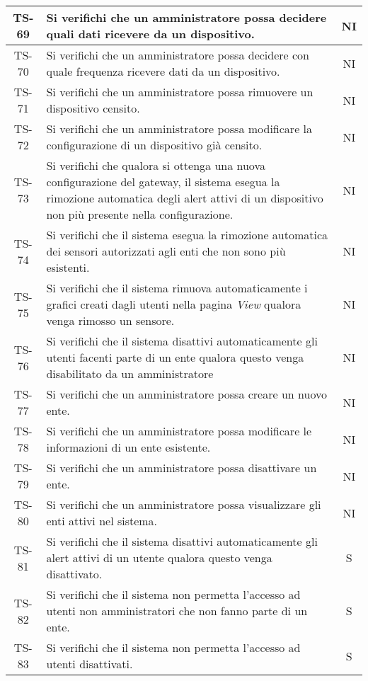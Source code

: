 \begin{center}
\begin{longtable}{|c|p{10cm}|c|}
			 \hline
			 TS-69 & Si verifichi che un amministratore possa decidere quali dati ricevere da un dispositivo. & NI \\
			 \hline
			 TS-70 & Si verifichi che un amministratore possa decidere con quale frequenza ricevere dati da un dispositivo. & NI \\
			 \hline
			 TS-71 & Si verifichi che un amministratore possa rimuovere un dispositivo censito. & NI \\
			 \hline
			 TS-72 & Si verifichi che un amministratore possa modificare la configurazione di un dispositivo già censito. & NI \\
			 \hline
			 TS-73 & Si verifichi che qualora si ottenga una nuova configurazione del gateway, il sistema esegua la rimozione automatica degli alert attivi di un dispositivo non più presente nella configurazione. & NI \\
			 \hline
			 TS-74 & Si verifichi che il sistema esegua la rimozione automatica dei sensori autorizzati agli enti che non sono più esistenti. & NI \\
			 \hline
			 TS-75 & Si verifichi che il sistema rimuova automaticamente i grafici creati dagli utenti nella pagina \textit{View} qualora venga rimosso un sensore. & NI \\
			 \hline
			 TS-76 & Si verifichi che il sistema disattivi automaticamente gli utenti facenti parte di un ente qualora questo venga disabilitato da un amministratore & NI \\
			 \hline
			 TS-77 & Si verifichi che un amministratore possa creare un nuovo ente. & NI \\
			 \hline
			 TS-78 & Si verifichi che un amministratore possa modificare le informazioni di un ente esistente. & NI \\
			 \hline
			 TS-79 & Si verifichi che un amministratore possa disattivare un ente. & NI \\
			 \hline
			 TS-80 & Si verifichi che un amministratore possa visualizzare gli enti attivi nel sistema. & NI \\
			 \hline
			 TS-81 & Si verifichi che il sistema disattivi automaticamente gli alert attivi di un utente qualora questo venga disattivato. & S \\
			 \hline
			 TS-82 & Si verifichi che il sistema non permetta l'accesso ad utenti non amministratori che non fanno parte di un ente. & S \\
			 \hline
			 TS-83 & Si verifichi che il sistema non permetta l'accesso ad utenti disattivati. & S \\

\end{longtable}
\end{center}
